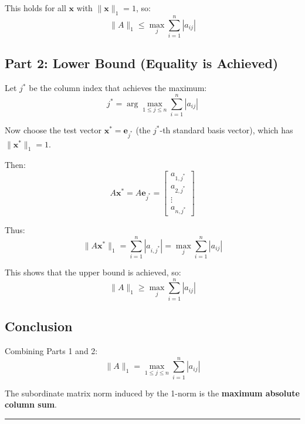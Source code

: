 This holds for all $\mathbf{x}$ with $\|\mathbf{x}\|_1 = 1$, so:
$$\|A\|_1 \leq \max_{j} \sum_{i=1}^{n} |a_{ij}|$$

\subsection*{Part 2: Lower Bound (Equality is Achieved)}

Let $j^*$ be the column index that achieves the maximum:
$$j^* = \arg\max_{1 \leq j \leq n} \sum_{i=1}^{n} |a_{ij}|$$

Now choose the test vector $\mathbf{x}^* = \mathbf{e}_{j^*}$ (the $j^*$-th standard basis vector), which has $\|\mathbf{x}^*\|_1 = 1$.

Then:
$$A\mathbf{x}^* = A\mathbf{e}_{j^*} = \begin{bmatrix} a_{1,j^*} \\ a_{2,j^*} \\ \vdots \\ a_{n,j^*} \end{bmatrix}$$

Thus:
$$\|A\mathbf{x}^*\|_1 = \sum_{i=1}^{n} |a_{i,j^*}| = \max_{j} \sum_{i=1}^{n} |a_{ij}|$$

This shows that the upper bound is achieved, so:
$$\|A\|_1 \geq \max_{j} \sum_{i=1}^{n} |a_{ij}|$$

\subsection*{Conclusion}

Combining Parts 1 and 2:
$$\boxed{\|A\|_1 = \max_{1 \leq j \leq n} \sum_{i=1}^{n} |a_{ij}|}$$

The subordinate matrix norm induced by the 1-norm is the \textbf{maximum absolute column sum}.

\vspace{2em}
\noindent\rule{\textwidth}{0.4pt}
